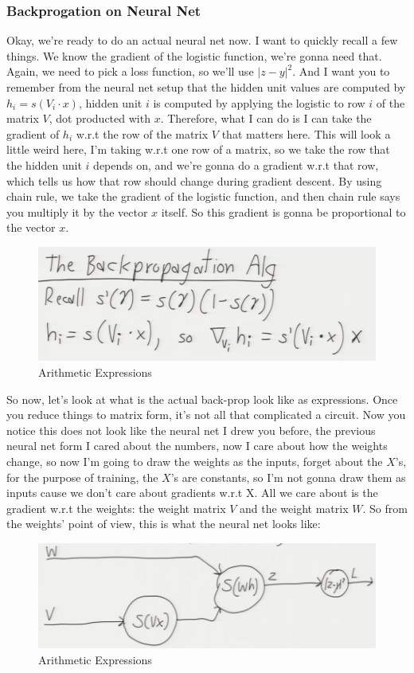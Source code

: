 \documentclass[fleqn,10pt]{olplainarticle}
\theoremstyle{definition}
\theoremstyle{remark}
\begin{document}
\subsubsection*{Backprogation on Neural Net}
Okay, we're ready to do an actual neural net now. I want to quickly recall a few things. We know the gradient of the logistic function, we're gonna need that. Again, we need to pick a loss function, so we'll use $|z-y|^2$. And I want you to remember from the neural net setup that the hidden unit values are computed by $h_i=s(V_i \cdot x)$, hidden unit $i$ is computed by applying the logistic to row $i$ of the matrix $V$, dot producted with $x$. Therefore, what I can do is I can take the gradient of $h_i$ w.r.t the row of the matrix $V$ that matters here. This will look a little weird here, I'm taking w.r.t one row of a matrix, so we take the row that the hidden unit $i$ depends on, and we're gonna do a gradient w.r.t that row, which tells us how that row should change during gradient descent. By using chain rule, we take the gradient of the logistic function, and then chain rule says you multiply it by the vector $x$ itself. So this gradient is gonna be proportional to the vector $x$.  
\begin{figure}[ht]
\centering
\includegraphics[width=0.7\linewidth]{images/arithmetic_expression_16}
\caption{Arithmetic Expressions}
\label{fig:arithmetic_expression_16}
\end{figure}

So now, let's look at what is the actual back-prop look like as expressions. Once you reduce things to matrix form, it's not all that complicated a circuit. Now you notice this does not look like the neural net I drew you before, the previous neural net form I cared about the numbers, now I care about how the weights change, so now I'm going to draw the weights as the inputs, forget about the $X$'s, for the purpose of training, the $X$'s are constants, so I'm not gonna draw them as inputs cause we don't care about gradients w.r.t X. All we care about is the gradient w.r.t the weights: the weight matrix $V$ and the weight matrix $W$. So from the weights' point of view, this is what the neural net looks like:
\begin{figure}[ht]
\centering
\includegraphics[width=0.7\linewidth]{images/arithmetic_expression_17}
\caption{Arithmetic Expressions}
\label{fig:arithmetic_expression_17}
\end{figure}
\clearpage
\end{document}
